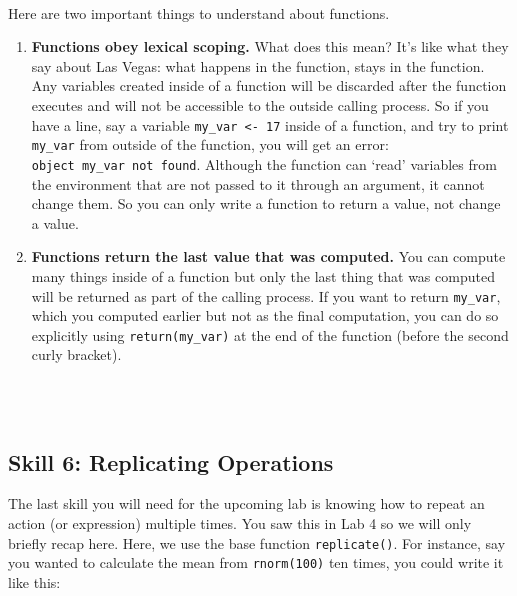 \documentclass[]{book}
\newenvironment{info}
    {
    \hline\\
    }
    { 
    \\\\\hline
    }
\begin{document}
\begin{info}
Here are two important things to understand about functions.

\begin{enumerate}
.{enumi{enumi}.}
\item
  \textbf{Functions obey lexical scoping.} What does this mean? It's
  like what they say about Las Vegas: what happens in the function,
  stays in the function. Any variables created inside of a function will
  be discarded after the function executes and will not be accessible to
  the outside calling process. So if you have a line, say a variable
  \texttt{my\_var\ \textless{}-\ 17} inside of a function, and try to
  print \texttt{my\_var} from outside of the function, you will get an
  error:
  \texttt{object\ \textquotesingle{}my\_var\textquotesingle{}\ not\ found}.
  Although the function can `read' variables from the environment that
  are not passed to it through an argument, it cannot change them. So
  you can only write a function to return a value, not change a value.
\item
  \textbf{Functions return the last value that was computed.} You can
  compute many things inside of a function but only the last thing that
  was computed will be returned as part of the calling process. If you
  want to return \texttt{my\_var}, which you computed earlier but not as
  the final computation, you can do so explicitly using
  \texttt{return(my\_var)} at the end of the function (before the second
  curly bracket).
\end{enumerate}
\end{info}

\hypertarget{skill-6-replicating-operations}{%
\subsection{Skill 6: Replicating Operations}\label{skill-6-replicating-operations}}

The last skill you will need for the upcoming lab is knowing how to repeat an action (or expression) multiple times. You saw this in Lab 4 so we will only briefly recap here. Here, we use the base function \texttt{replicate()}. For instance, say you wanted to calculate the mean from \texttt{rnorm(100)} ten times, you could write it like this:
\end{document}
